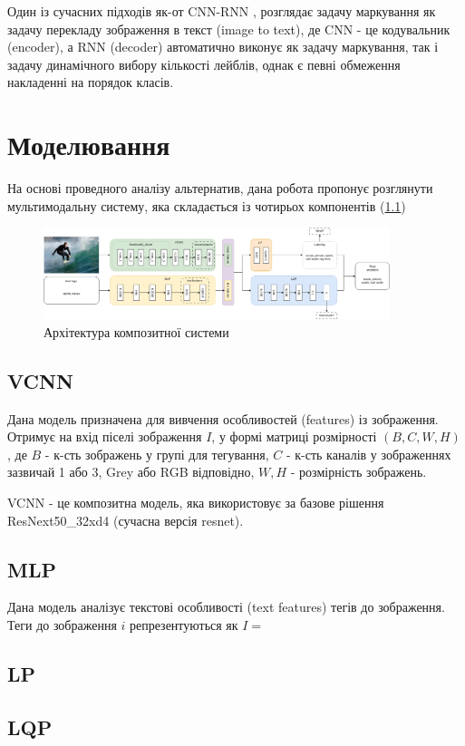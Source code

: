 \documentclass{udstu}
\begin{document}
Один із сучасних підходів як-от CNN-RNN \cite{cnn-rnn},
розглядає задачу маркування як задачу перекладу зображення в текст (image to text),
де CNN - це кодувальник (encoder), а RNN (decoder) автоматично виконує як задачу маркування,
так і задачу динамічного вибору кількості лейблів, однак є певні обмеження
накладенні на порядок класів.


\chapter{Моделювання}

На основі проведного аналізу альтернатив, дана робота пропонує розглянути
мультимодальну систему, яка складається із чотирьох компонентів (\figurename{\ref{figure:composite}})

\begin{figure}[!ht]
	\centering
	\includegraphics[width=0.9\textwidth]{PNG/composite}
	\caption{Архітектура композитної системи}
	\label{figure:composite}
\end{figure}

\section{VCNN}

Дана модель призначена для вивчення особливостей (features) із зображення.
Отримує на вхід піселі зображення $I$, у формі матриці розмірності $(B,C,W,H)$, де
$B$ - к-сть зображень у групі для тегування,
$C$ - к-сть каналів у зображеннях зазвичай 1 або 3, Grey або RGB відповідно,
$W,H$ - розмірність зображень.

VCNN - це композитна модель, яка використовує за базове рішення ResNext50\_32xd4 \cite{resnext} (сучасна версія resnet).




\section{MLP}

Дана модель аналізує текстові особливості (text features) тегів до зображення.
Теги до зображення $i$ репрезентуються як $I = $

\section{LP}


\section{LQP}



\conclusions

\printbibliography
\end{document}
